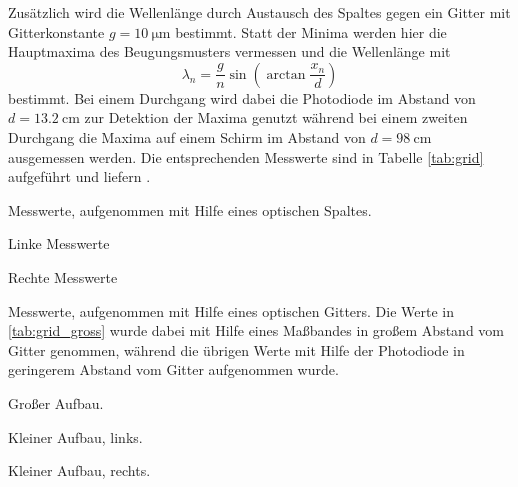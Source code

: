 Zusätzlich wird die Wellenlänge durch Austausch des Spaltes gegen ein Gitter mit Gitterkonstante $g = \SI{10}{\micro\meter}$ bestimmt.
Statt der Minima werden hier die Hauptmaxima des Beugungsmusters vermessen und die Wellenlänge mit
\begin{equation}
\label{eq:gitter}
    \lambda_n = \frac{g}{n}\sin\!\left(\arctan\frac{x_n}{d}\right)
\end{equation}
bestimmt.
Bei einem Durchgang wird dabei die Photodiode im Abstand von $d = \SI{13.2}{\centi\meter}$ zur Detektion der Maxima genutzt während bei einem zweiten Durchgang die Maxima auf einem Schirm im Abstand von $d = \SI{98}{\centi\meter}$ ausgemessen werden.
Die entsprechenden Messwerte sind in Tabelle \ref{tab:grid} aufgeführt und liefern \unskip.
\begin{table}
    \centering
    \caption{Messwerte, aufgenommen mit Hilfe eines optischen Spaltes.}
    \label{tab:spalt}
    \begin{subtable}{0.49\linewidth}
        \centering
        \caption{Linke Messwerte}
        \label{tab:spalt_links}
        
    \end{subtable}
    \begin{subtable}{0.49\linewidth}
        \centering
        \caption{Rechte Messwerte}
        \label{tab:spalt_rechts}
        
    \end{subtable}
\end{table}
\begin{table}
    \centering
    \caption{
        Messwerte, aufgenommen mit Hilfe eines optischen Gitters.
        Die Werte in \ref{tab:grid_gross} wurde dabei mit Hilfe eines
        Maßbandes in großem Abstand vom Gitter genommen, während die übrigen
        Werte mit Hilfe der Photodiode in geringerem Abstand vom Gitter
        aufgenommen wurde.
    }
    \label{tab:grid}
    \begin{subtable}[t]{0.32\linewidth}
        \centering
        \caption{Großer Aufbau.}
        \label{tab:grid_gross}
        
    \end{subtable}
    \begin{subtable}[t]{0.32\linewidth}
        \centering
        \caption{Kleiner Aufbau, links.}
        \label{tab:grid_links}
        
    \end{subtable}
    \begin{subtable}[t]{0.32\linewidth}
        \centering
        \caption{Kleiner Aufbau, rechts.}
        \label{tab:grid_rechts}
        
    \end{subtable}
\end{table}
